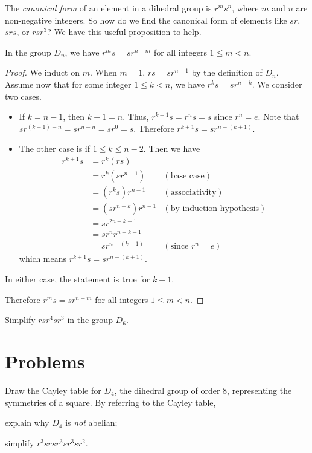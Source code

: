 The \textit{canonical form} of an element in a dihedral group is $r^ms^n$, where $m$ and $n$ are non-negative integers. So how do we find the canonical form of elements like $sr$, $srs$, or $rsr^3$? We have this useful proposition to help.
\begin{proposition}\label{prop-Dn-cannonical-form}
    In the group $D_n$, we have $r^ms = sr^{n-m}$ for all integers $1 \leq m < n$.
\end{proposition}
\begin{proof}
    We induct on $m$. When $m = 1$, $rs = sr^{n-1}$ by the definition of $D_n$. Assume now that for some integer $1 \leq k < n$, we have $r^ks = sr^{n-k}$. We consider two cases.
    \begin{itemize}
        \item If $k = n - 1$, then $k + 1 = n$. Thus, $r^{k+1}s = r^ns = s$ since $r^n = e$. Note that $sr^{(k+1)-n} = sr^{n-n} = sr^0 = s$. Therefore $r^{k+1}s = sr^{n-(k+1)}$.
        \item The other case is if $1 \leq k \leq n - 2$. Then we have
        \begin{align*}
            r^{k+1}s &= r^k(rs)\\
            &= r^k(sr^{n-1}) & (\text{base case})\\
            &= (r^ks)r^{n-1} & (\text{associativity})\\
            &= (sr^{n-k})r^{n-1} & (\text{by induction hypothesis})\\
            &= sr^{2n - k - 1}\\
            &= sr^nr^{n-k-1}\\
            &= sr^{n-(k+1)} & (\text{since } r^n = e)
        \end{align*}
        which means $r^{k+1}s = sr^{n-(k+1)}$.
    \end{itemize}
    In either case, the statement is true for $k+1$.

    Therefore $r^ms = sr^{n-m}$ for all integers $1 \leq m < n$.
\end{proof}

\begin{exercise}
    Simplify $rsr^4sr^3$ in the group $D_6$.
\end{exercise}

\newpage

\section{Problems}
\begin{problem}
    Draw the Cayley table for $D_4$, the dihedral group of order 8, representing the symmetries of a square.\newline
    By referring to the Cayley table,
    \begin{partquestions}{\alph*}
        \item explain why $D_4$ is \textit{not} abelian;
        \item simplify $r^3srsr^3sr^3sr^2$.
    \end{partquestions}
\end{problem}

